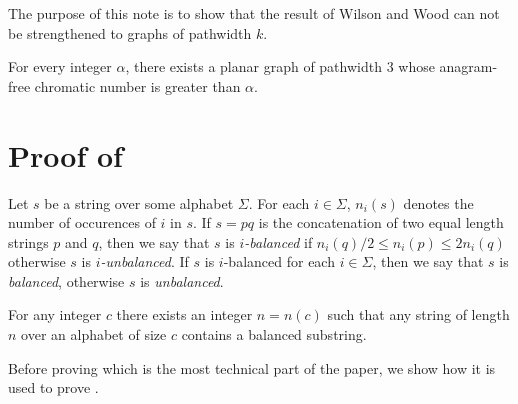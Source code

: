\documentclass{patmorin}
\begin{document}
The purpose of this note is to show that the result of Wilson and
Wood can not be strengthened to graphs of pathwidth $k$.

\begin{thm}
  For every integer $\alpha$, there exists a planar graph of pathwidth
  3 whose anagram-free chromatic number is greater than $\alpha$.
\end{thm}



\section{Proof of }

Let $s$ be a string over some alphabet $\Sigma$.  For each $i\in\Sigma$,
$n_i(s)$ denotes the number of occurences of $i$ in $s$.  If $s=pq$ is the
concatenation of two equal length strings $p$ and $q$, then we say that
$s$ is \emph{$i$-balanced} if $n_i(q)/2\le n_i(p)\le 2n_i(q)$ otherwise
$s$ is \emph{$i$-unbalanced}.  If $s$ is $i$-balanced for each $i\in \Sigma$,
then we say that $s$ is \emph{balanced}, otherwise $s$ is \emph{unbalanced}.

\begin{lem}
  For any integer $c$ there exists an integer $n=n(c)$ such that any string
  of length $n$ over an alphabet of size $c$ contains a balanced
  substring.
\end{lem}

Before proving  which is the most technical part of the paper,
we show how it is used to prove .
\end{document}
